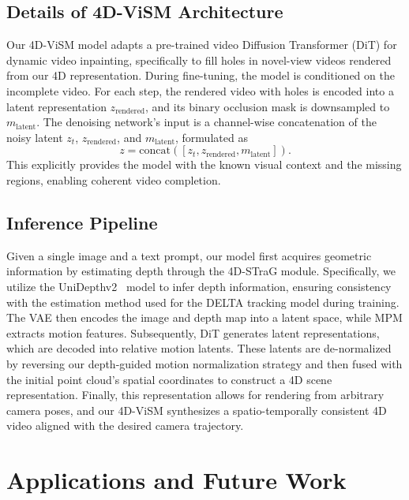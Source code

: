 \subsection{Details of 4D-ViSM Architecture}
Our 4D-ViSM model adapts a pre-trained video Diffusion Transformer (DiT) for dynamic video inpainting, specifically to fill holes in novel-view videos rendered from our 4D representation. During fine-tuning, the model is conditioned on the incomplete video. For each step, the rendered video with holes is encoded into a latent representation $z_{\text{rendered}}$, and its binary occlusion mask is downsampled to $m_{\text{latent}}$. The denoising network's input is a channel-wise concatenation of the noisy latent $z_t$, $z_{\text{rendered}}$, and $m_{\text{latent}}$, formulated as 
$$z = \text{concat}([z_t, z_{\text{rendered}}, m_{\text{latent}}]).$$
This explicitly provides the model with the known visual context and the missing regions, enabling coherent video completion.


\subsection{Inference Pipeline}

Given a single image and a text prompt, our model first acquires geometric information by estimating depth through the 4D-STraG module. Specifically, we utilize the UniDepthv2~\cite{unidepthv2} model to infer depth information, ensuring consistency with the estimation method used for the DELTA tracking model during training. The VAE then encodes the image and depth map into a latent space, while MPM extracts motion features. Subsequently, DiT generates latent representations, which are decoded into relative motion latents. These latents are de-normalized by reversing our depth-guided motion normalization strategy and then fused with the initial point cloud's spatial coordinates to construct a 4D scene representation. Finally, this representation allows for rendering from arbitrary camera poses, and our 4D-ViSM synthesizes a spatio-temporally consistent 4D video aligned with the desired camera trajectory.


\section{Applications and Future Work}
\label{sec:g}

